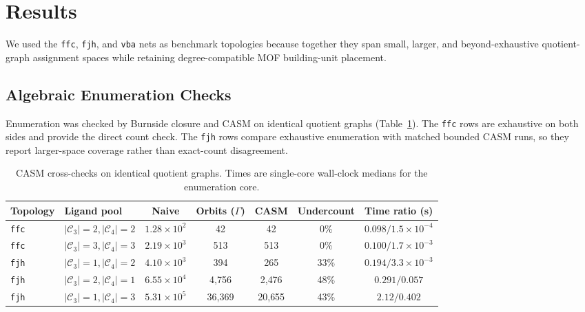 \documentclass[pdflatex,sn-mathphys-num]{sn-jnl}
\theoremstyle{thmstyleone}%
\begin{document}
\section*{Results}

We used the \texttt{ffc}, \texttt{fjh}, and \texttt{vba} nets as benchmark topologies because together they span small, larger, and beyond-exhaustive quotient-graph assignment spaces while retaining degree-compatible MOF building-unit placement.

\subsection*{Algebraic Enumeration Checks}
Enumeration was checked by Burnside closure and CASM on identical quotient graphs (Table~\ref{tab:casm}). The \texttt{ffc} rows are exhaustive on both sides and provide the direct count check. The \texttt{fjh} rows compare exhaustive enumeration with matched bounded CASM runs, so they report larger-space coverage rather than exact-count disagreement.

\begin{table}[htbp]
\centering
\tiny
\setlength{\tabcolsep}{1.0mm}
\renewcommand{\arraystretch}{1.2}
\caption{CASM cross-checks on identical quotient graphs. Times are single-core wall-clock medians for the enumeration core.}
\label{tab:casm}
\begin{tabular}{llccccc}
\toprule
\textbf{Topology} & \textbf{Ligand pool} & \textbf{Naive} & \textbf{Orbits ($\Gamma$)} & \textbf{CASM} & \textbf{Undercount} & \textbf{Time ratio (s)} \\
\midrule
\texttt{ffc} & $|\mathcal{C}_3|{=}2,|\mathcal{C}_4|{=}2$ & $1.28\times10^{2}$ & 42      & 42      & 0\%  & $0.098 / 1.5\!\times\!10^{-4}$ \\
\texttt{ffc} & $|\mathcal{C}_3|{=}3,|\mathcal{C}_4|{=}3$ & $2.19\times10^{3}$ & 513     & 513     & 0\%  & $0.100 / 1.7\!\times\!10^{-3}$ \\
\midrule
\texttt{fjh} & $|\mathcal{C}_3|{=}1,|\mathcal{C}_4|{=}2$ & $4.10\times10^{3}$ & 394     & 265     & 33\% & $0.194 / 3.3\!\times\!10^{-3}$ \\
\texttt{fjh} & $|\mathcal{C}_3|{=}2,|\mathcal{C}_4|{=}1$ & $6.55\times10^{4}$ & 4{,}756 & 2{,}476 & 48\% & $0.291 / 0.057$ \\
\texttt{fjh} & $|\mathcal{C}_3|{=}1,|\mathcal{C}_4|{=}3$ & $5.31\times10^{5}$ & 36{,}369& 20{,}655& 43\% & $2.12 / 0.402$ \\
\bottomrule
\end{tabular}
\end{table}
\end{document}

